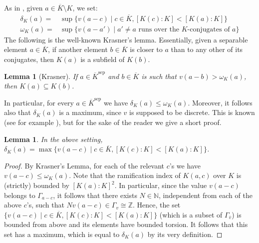 \documentclass[10pt]{article}
\numberwithin{equation}{section}
\newtheorem{Lem}[equation]{Lemma}
\theoremstyle{definition}\newtheorem{Def}[equation]{Definition}
\theoremstyle{definition}\newtheorem{Ques}[equation]{Question}
\newcommand{\N}{\mathbb{N}}
\newcommand{\Z}{\mathbb{Z}}
\begin{document}
As in \cite{KhaSa}, given $a\in\overline{K}\setminus K$, we set:
\begin{align*}
\delta_K(a)=&\sup\{v(a-c)\mid c\in\overline{K},[K(c):K]<[K(a):K]\}\\
\omega_K(a)=&\sup\{v(a-a')\mid a'\not=a\text{ runs over the }K\text{-conjugates of }a\}
\end{align*}
The following is the well-known Krasner's lemma. Essentially, given a separable element $a\in\overline{K}$, if another element $b\in\overline{K}$ is closer to $a$ than to any other of its conjugates, then $K(a)$ is a subfield of $K(b)$.
\begin{Lem}[Krasner]
If $a\in\overline{K}^{\text{sep}}$ and $b\in\overline{K}$ is such that $v(a-b)>\omega_K(a)$, then $K(a)\subseteq K(b)$.
\end{Lem}
In particular, for every $a\in\overline{K}^{\text{sep}}$ we have $\delta_K(a)\leq \omega_K(a)$. Moreover, it follows also that $\delta_K(a)$ is a maximum, since $v$ is supposed to be discrete. This is known (see for example \cite[p. 105]{PZstructure}), but for the sake of the reader we give a short proof.

\begin{Lem}\label{deltaK maximum}
In the above setting, $\delta_K(a)=\max\{v(a-c)\mid c\in\overline{K},[K(c):K]<[K(a):K]\}$.
\end{Lem}
\begin{proof}
By Krasner's Lemma, for each of the relevant $c$'s we have  $v(a-c)\leq \omega_K(a)$. Note that the ramification index of $K(a,c)$ over $K$ is (strictly) bounded by $[K(a):K]^2$. In particular, since the value $v(a-c)$ belongs to $\Gamma_{a-c}$, it follows that there exists $N\in\N$, independent from each of the above $c$'s, such that $Nv(a-c)\in\Gamma_v\cong\Z$. Hence, the set $\{v(a-c)\mid c\in\overline{K},[K(c):K]<[K(a):K]\}$ (which is a subset of $\Gamma_{\overline{v}}$) is bounded from above and its elements have bounded torsion. It follows that this set has a maximum, which is equal to $\delta_K(a)$ by its very definition.
\end{proof}
\end{document}
